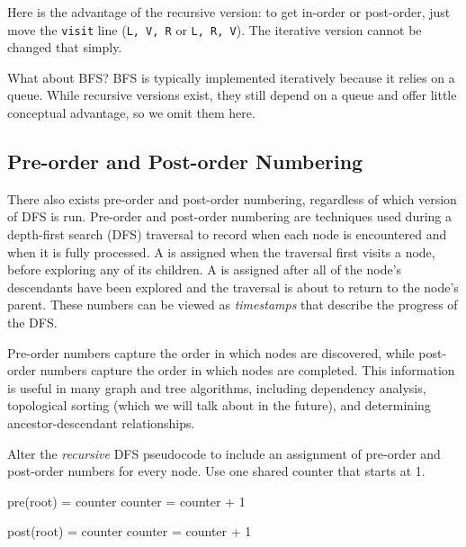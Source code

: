 Here is the advantage of the recursive version: to get in-order or post-order, just move the \texttt{visit} line (\texttt{L, V, R} or \texttt{L, R, V}). The iterative version cannot be changed that simply.

What about BFS? BFS is typically implemented iteratively because it relies on a queue. While recursive versions exist, they still depend on a queue and offer little conceptual advantage, so we omit them here.
\subsection{Pre-order and Post-order Numbering}
There also exists pre-order and post-order numbering, regardless of which version of DFS is run.
Pre-order and post-order numbering are techniques used during a depth-first search (DFS) traversal to record when each node is encountered and when it is fully processed.
A  is assigned when the traversal first visits a node, before exploring any of its children. A  is assigned after all of the node's descendants have been explored and the traversal is about to return to the node's parent. These numbers can be viewed as \textit{timestamps} that describe the progress of the DFS.

Pre-order numbers capture the order in which nodes are discovered, while post-order numbers capture the order in which nodes are completed. This information is useful in many graph and tree algorithms, including dependency analysis, topological sorting (which we will talk about in the future), and determining ancestor-descendant relationships.

\begin{Exercise}[title={DFS Pseudocode}, label={ex:pre_post1}]


    Alter the \emph{recursive} DFS pseudocode to include an assignment of pre-order and post-order numbers for every node. Use one shared counter that starts at 1.


\end{Exercise}

\begin{Answer}[ref={ex:pre_post1}]
    \begin{algorithmic}
        \State \Return
        \EndIf

        \State pre(root) = counter
        \State counter = counter + 1

        \State {}
        \State {}

        \State post(root) = counter
        \State counter = counter + 1
        \EndProcedure
    \end{algorithmic}



\end{Answer}

